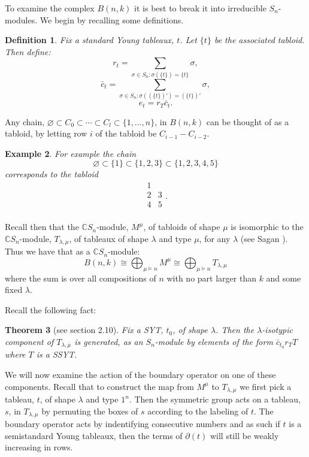 \documentclass{elsart}
\newtheorem{theorem}{Theorem}[section]
\newtheorem{definition}[theorem]{Definition}
\newtheorem{example}[theorem]{Example}
\newcommand{\C}{\mathbb{C}}
\newcommand{\GC}{\varnothing \subset C_0 \subset \cdots \subset C_l \subset \{1, \ldots, n\}}
\begin{document}
To examine the complex $B(n, k)$ it is best to break it into irreducible $S_n$-modules. We begin by recalling some 
definitions.

\begin{definition}
  Fix a standard Young tableaux, $t$. Let $\{t\}$ be the associated tabloid. Then define:
  $$ r_t = \sum_{\sigma \in S_n \colon \sigma(\{t\}) = \{t\}} \sigma,$$
  $$ {\bar c}_t = \sum_{\sigma \in S_n \colon \sigma((\{t\})') = (\{t\})'} \sigma,$$
  $$ e_t = r_T {\bar c_t}.$$
\end{definition}


Any chain, $\GC$,  in $B(n, k)$ can be thought of as a tabloid, by letting row $i$ of 
the tabloid be $C_{i-1} - C_{i-2}$. 

\begin{example} \label{E:chaintooid}
  For example the chain
  $$ \varnothing \subset \{1\} \subset \{1,2,3\} \subset \{1,2,3,4,5\}$$ corresponds to the tabloid
  $$\begin{array}{cc}
    1 &   \\
    2 & 3 \\
    4 & 5 \\
  \end{array}.$$
\end{example}

Recall then that the $\C S_n$-module, $M^\mu$,  of tabloids of shape $\mu$ is isomorphic
to the $\C S_n$-module, $T_{\lambda, \mu}$, of tableaux of shape $\lambda$ and type $\mu$, for any $\lambda$ (see Sagan 
\cite{Sagan}). Thus we have that as a $\C S_n$-module:
$$ B(n, k) \cong \bigoplus_{\mu \models n} M^\mu \cong \bigoplus_{\mu \models n} T_{\lambda, \mu}$$ where the sum is over 
all compositions of $n$ with no part larger than $k$ and some fixed $\lambda$. 

Recall the following fact:

\begin{theorem}[see \cite{Sagan} section 2.10]
  Fix a SYT, $t_0$,  of shape $\lambda$. Then the $\lambda$-isotypic component of $T_{\lambda, \mu}$ is generated, as an
  $S_n$-module by elements of the form $\bar{c}_{t_0} r_T T$ where $T$ is a SSYT. 
\end{theorem}

We will now examine the action of the boundary operator on one of these components. Recall that to construct the
map from $M^\mu$ to $T_{\lambda, \mu}$ we first pick a tableau, $t$,  of shape $\lambda$ and type $1^n$. Then the 
symmetric group acts on a tableau, $s$,  in $T_{\lambda, \mu}$ by permuting the boxes of $s$ according to the labeling of
$t$. The boundary operator acts by indentifying consecutive numbers and as such if $t$ is a semistandard Young tableaux, 
then the terms of $\partial(t)$ will still be weakly increasing in rows. 
\end{document}
